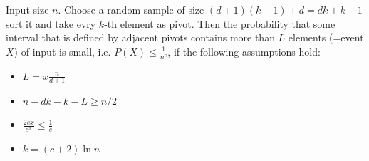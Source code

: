 \begin{lem} Input size $n$. Choose a random sample of size $(d+1)(k-1)+d = dk+k-1$ sort it and take evry $k$-th element as pivot. Then the probability that some interval that is defined by adjacent pivots contains more than $L$ elements (=event $X$) of input is small, i.e. $P(X) \leq \frac{1}{n^c}$, if the following assumptions hold:

\begin{itemize}
\item $L=x\frac{n}{d+1}$
\item $n-dk-k-L \geq n/2$
\item $\frac{2ex}{e^x} \leq \frac 1e$
\item $k = (c+2)\ln n$
\end{itemize}

\end{lem}

